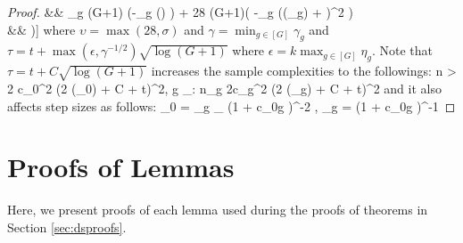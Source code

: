 \begin{proof}
	\be 
	\nr 
	&& \sigma_g (G+1) \exp\left(-\min_{g \in [G]} \left(\min{}\right) \right)
	+ 28 (G+1)\exp\left( -\gamma \min_{g \in [G]} (\omega(\cA_g) + \tau)^2  \right) 
	\\ \nr 
	&\leq& \upsilon  \exp\left[\min_{g \in [G]}\left(-\min\left[\nu_g n_g - \log G, \gamma (\omega(\cA_g) + t)^2 , \frac{t^2}{\eta_g^2 k^2}\right]\right)\right] 
	\ee	
	where $\upsilon = \max(28, \sigma)$ and $\gamma = \min_{g \in [G] } \gamma_g$ and $\tau = t + \max(\epsilon,\gamma^{-1/2}) \sqrt{\log(G+1)} $ where $\epsilon = k\max_{g \in [G]} \eta_g $. 
	Note that  $\tau = t + C\sqrt{\log (G+1)}$ increases the sample complexities to the followings:
	\be 
	\nr 
	n > 2 c_0^2 \left(2 \omega(\cA_0) + C + t\right)^2, \forall g \in [G]_\setminus: n_g \geq 2c_g^2 (2 \omega(\cA_g) + C  + t)^2
	\ee 
	and it also affects step sizes as follows:
	\be
	\nr  
	\mu_0 =  \times \min_{g \in [G]_\setminus} \left(1 + c_{0g} \right)^{-2} , \mu_g =   \left(1 + c_{0g} \right)^{-1}
	\ee 
	
	
		

\end{proof} 




\section{Proofs of Lemmas}
\label{sec:lemmas}
Here, we present proofs of each lemma used during the proofs of theorems in Section \ref{sec:dsproofs}.


